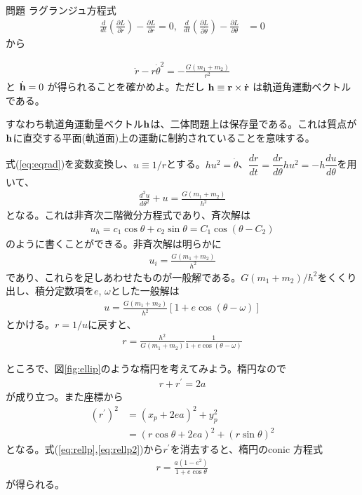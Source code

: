 \color{red}
\begin{itembox}{問題}
\footnotesize
\color{gray}
ラグランジュ方程式
\begin{align}
\frac{d}{dt} \left( \frac{\partial L}{\partial \dot{r}}\right) - \frac{\partial L}{\partial r} = 0, \,\,\,
\frac{d}{dt} \left( \frac{\partial L}{\partial \dot{\theta}}\right) - \frac{\partial L}{\partial \theta} &= 0
\end{align}
から

\begin{align}
\label{eq:eqrad}
 \ddot{r} - r \dot{\theta}^2 = - \frac{G (m_1+m_2)}{r^2}
\end{align}
と
$
\dot{\bf h} =  0
$
が得られることを確かめよ。ただし
$
{\bf h} \equiv {\bf r} \times \dot{\bf r} 
$
は軌道角運動ベクトルである。

すなわち軌道角運動量ベクトル${\bf h}$は、二体問題上は保存量である。これは質点が${\bf h}$に直交する平面(軌道面)上の運動に制約されていることを意味する。
\end{itembox}
\color{black}



式(\ref{eq:eqrad})を変数変換し、$u \equiv 1/r$とする。$h u^2 = \dot{\theta}$、$\dfrac{d r}{d t} = \dfrac{d r}{d \theta} h u^2 = - h \dfrac{d u}{d \theta}$を用いて、
\begin{align}
\frac{d^2 u}{d \theta^2} + u = \frac{G (m_1 + m_2)}{h^2}
\end{align}
となる。これは非斉次二階微分方程式であり、斉次解は
\begin{align}
u_h = c_1 \cos{\theta} + c_2 \sin{\theta} = C_1 \cos{(\theta - C_2)}
\end{align}
のように書くことができる。非斉次解は明らかに
\begin{align}
u_i = \frac{G (m_1 + m_2)}{h^2}
\end{align}
であり、これらを足しあわせたものが一般解である。$G (m_1 + m_2)/h^2$をくくり出し、積分定数項を$e$, $\omega$とした一般解は
\begin{align}
u = \frac{G (m_1 + m_2)}{h^2} [ 1 + e \cos{(\theta - \omega)}]
\end{align}
とかける。$r=1/u$に戻すと、
\begin{align}
\label{eq:eqkep}
r =  \frac{h^2}{G (m_1 + m_2)} \frac{1}{ 1 + e \cos{(\theta - \omega)}} 
\end{align}

ところで、図\ref{fig:ellip}のような楕円を考えてみよう。楕円なので
\begin{align}
\label{eq:rellp}
r + r^\prime = 2 a
\end{align}
が成り立つ。また座標から
\begin{align}
\label{eq:rellp2}
(r^\prime)^2 &= (x_p + 2 e a )^2 + y_p^2 \nonumber \\
&= (r \cos{\theta} + 2 e a )^2 + (r \sin{\theta})^2
\end{align}
となる。式(\ref{eq:rellp},\ref{eq:rellp2})から$r^\prime$を消去すると、楕円のconic 方程式
\begin{align}
\label{eq:conic_orig}
r =  \frac{a (1-e^2)}{ 1 + e \cos{\theta}} 
\end{align}
が得られる。

